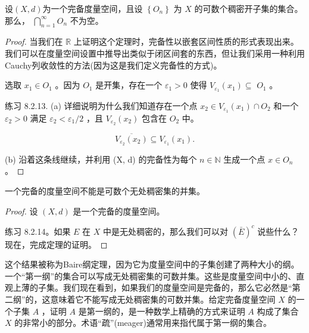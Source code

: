 \begin{Thm}
  \label{thm:8.2.10}
  设$(X, d)$为一个完备度量空间，且设 \(\left\{  {O}_{n}\right\}\) 为 \(X\) 的可数个稠密开子集的集合。那么， \(\mathop{\bigcap }\limits_{{n = 1}}^{\infty }{O}_{n}\) 不为空。
\end{Thm}

\begin{proof}
当我们在 \(\mathbb{R}\) 上证明这个定理时，完备性以嵌套区间性质的形式表现出来。我们可以在度量空间设置中推导出类似于闭区间套的东西，但让我们采用一种利用Cauchy列收敛性的方法(因为这是我们定义完备性的方式)。

选取 \({x}_{1} \in  {O}_{1}\) 。因为 \({O}_{1}\) 是开集，存在一个 \({\varepsilon }_{1} > 0\) 使得 \({V}_{{\varepsilon }_{1}}\left( {x}_{1}\right)  \subseteq\)  \({O}_{1}\) 。

练习 8.2.13. (a) 详细说明为什么我们知道存在一个点 \({x}_{2} \in  {V}_{{\varepsilon }_{1}}\left( {x}_{1}\right)  \cap  {O}_{2}\) 和一个 \({\varepsilon }_{2} > 0\) 满足 \({\varepsilon }_{2} < {\varepsilon }_{1}/2\) ，且 \({V}_{{\varepsilon }_{2}}\left( {x}_{2}\right)\) 包含在 \({O}_{2}\) 中。

\[
\overline{{V}_{{\varepsilon }_{2}}\left( {x}_{2}\right) } \subseteq  {V}_{{\varepsilon }_{1}}\left( {x}_{1}\right) .
\]

(b) 沿着这条线继续，并利用 (X, d) 的完备性为每个 \(n \in  \mathbb{N}\) 生成一个点 \(x \in  {O}_{n}\) 。
\end{proof}


\begin{Thm}
  \label{thm:8.2.11}
  一个完备的度量空间不能是可数个无处稠密集的并集。
\end{Thm}

\begin{proof}
  设 $(X, d)$ 是一个完备的度量空间。

练习 8.2.14。如果 \(E\) 在 \(X\) 中是无处稠密的，那么我们可以对 \({\left( \bar{E}\right) }^{c}\) 说些什么？现在，完成定理的证明。
\end{proof}

这个结果被称为Baire纲定理，因为它为度量空间中的子集创建了两种大小的纲。一个“第一纲”的集合可以写成无处稠密集的可数并集。这些是度量空间中小的、直观上薄的子集。我们现在看到，如果我们的度量空间是完备的，那么它必然是“第二纲”的，这意味着它不能写成无处稠密集的可数并集。给定完备度量空间 \(X\) 的一个子集 \(A\) ，证明 \(A\) 是第一纲的，是一种数学上精确的方式来证明 \(A\) 构成了集合 \(X\) 的非常小的部分。术语“疏”(meager)通常用来指代属于第一纲的集合。

